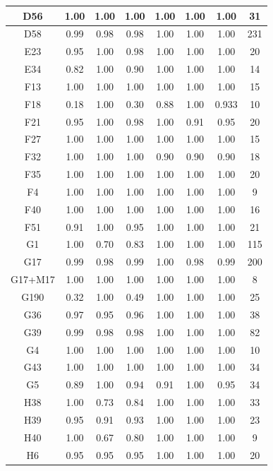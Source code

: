 \documentclass[10pt,onecolumn,letterpaper]{article}
\begin{document}
\begin{longtable}{|c|c|c|c|c|c|c|c|}
		D56 & 1.00 & 1.00 & 1.00    &1.00&1.00&1.00&  31 \\ \hline
		D58 & 0.99 & 0.98 & 0.98&1.00&1.00&1.00& 231 \\ \hline
		E23 & 0.95 & 1.00 & 0.98   &1.00&1.00&1.00&   20 \\ \hline
		E34 & 0.82 & 1.00 & 0.90    &1.00&1.00&1.00& 14 \\ \hline
		F13 & 1.00 & 1.00 & 1.00    &1.00&1.00&1.00& 15 \\ \hline
		F18 & 0.18 & 1.00 & 0.30    &0.88&1.00&0.933& 10 \\ \hline
		F21 & 0.95 & 1.00 & 0.98   &1.00&0.91&0.95&   20 \\ \hline
		F27 & 1.00 & 1.00 & 1.00    &1.00&1.00&1.00& 15 \\ \hline
		F32 & 1.00 & 1.00 & 1.00    &0.90&0.90&0.90& 18 \\ \hline
		F35 & 1.00 & 1.00 & 1.00    &1.00&1.00&1.00&  20 \\ \hline
		F4 & 1.00 & 1.00 & 1.00    &1.00&1.00&1.00&   9 \\ \hline
		F40 & 1.00 & 1.00 & 1.00    &1.00&1.00&1.00& 16 \\ \hline
		F51 & 0.91 & 1.00 & 0.95   &1.00&1.00&1.00&   21 \\ \hline
		G1 & 1.00 & 0.70 & 0.83   &1.00&1.00&1.00& 115 \\ \hline
		G17 & 0.99 & 0.98 & 0.99 &1.00&0.98&0.99& 200 \\ \hline
		G17+M17 & 1.00 & 1.00 & 1.00   &1.00&1.00&1.00&    8 \\ \hline
		G190 & 0.32 & 1.00 & 0.49   &1.00&1.00&1.00&   25 \\ \hline
		G36 & 0.97 & 0.95 & 0.96  &1.00&1.00&1.00&    38 \\ \hline
		G39 & 0.99 & 0.98 & 0.98  &1.00&1.00&1.00&    82 \\ \hline
		G4 & 1.00 & 1.00 & 1.00    &1.00&1.00&1.00& 10 \\ \hline
		G43 & 1.00 & 1.00 & 1.00  &1.00&1.00&1.00&    34 \\ \hline
		G5 & 0.89 & 1.00 & 0.94  &0.91&1.00&0.95&    34 \\ \hline
		H38 & 1.00 & 0.73 & 0.84   &1.00&1.00&1.00&   33 \\ \hline
		H39 & 0.95 & 0.91 & 0.93   &1.00&1.00&1.00&   23 \\ \hline
		H40 & 1.00 & 0.67 & 0.80    &1.00&1.00&1.00&   9 \\ \hline
		H6 & 0.95 & 0.95 & 0.95    &1.00&1.00&1.00&  20 \\ \hline

\end{longtable}
\end{document}
